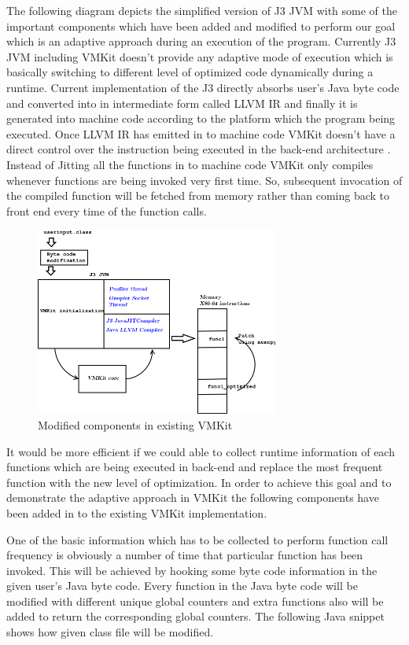 \label{sec:architecture}
The following diagram depicts the simplified version of J3 JVM with some of the important components which have been added and modified to perform our goal which is an adaptive approach during an execution of the program.  Currently J3 JVM including VMKit doesn't provide any adaptive mode of execution which is basically switching to different level of optimized code dynamically during a runtime.  Current implementation of the J3 directly absorbs user's Java byte code and converted into in intermediate form called LLVM IR and finally it is generated into machine code according to the platform which the program being executed. Once LLVM IR has emitted in to machine code VMKit doesn't have a direct control over the instruction being executed in the back-end architecture . Instead of Jitting all the functions in to machine code VMKit only compiles whenever functions are being invoked very first time. So, subsequent invocation of the compiled function will be fetched from memory rather than coming back to front end every time of the function calls.

\begin{figure}[ht!]
\centering
\includegraphics[width=80mm]{proposed_sytem.png}
\caption{Modified components in existing VMKit}
\label{fig:architecture}
\end{figure}

It would be more efficient if we could able to collect runtime information of each functions which are being executed in back-end and replace the most frequent function with the new level of optimization.  In order to achieve this goal and to demonstrate the adaptive approach in VMKit the following components have been added in to the existing VMKit implementation.

One of the basic information which has to be collected to perform function call frequency is obviously a number of time that particular function has been invoked. This will be achieved by hooking some byte code information in the given user's Java byte code. Every function in the Java byte code  will be modified with different unique global counters and extra functions also will be added to return the corresponding global counters.  The following Java snippet shows how given class file will be modified.

